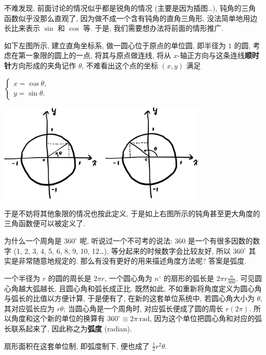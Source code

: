 \begin{tcolorbox}[size=fbox, breakable, enhanced jigsaw, title={任意角度的三角函数}]

不难发现, 前面讨论的情况似乎都是锐角的情况 (主要是因为插图\ldots),
钝角的三角函数似乎没那么直观了, 因为做不成一个含有钝角的直角三角形,
没法简单地用边长比来表示 $\sin$ 和 $\cos$ 等. 于是,
我们需要想办法将前面的情形推广.

如下左图所示, 建立直角坐标系, 做一圆心位于原点的单位圆, 即半径为 $1$
的圆, 考虑在第一象限的圆上的一点, 将其与原点做连线, 将从
$x$-轴正方向与这条连线\textbf{顺时针}方向形成的夹角记作 $\theta$,
不难看出这个点的坐标 $(x,y)$ 满足

$\begin{cases}x=\cos\theta,\\y=\sin\theta.\end{cases}$

\begin{tcolorbox}[size=fbox, breakable, enhanced jigsaw]
\includegraphics[width=0.75\textwidth]{img/image-20230316171124433.png}
\end{tcolorbox}

于是不妨将其他象限的情况也按此定义,
于是如上右图所示的钝角甚至更大角度的三角函数便可以被定义了.

\end{tcolorbox}

\begin{tcolorbox}[size=fbox, breakable, enhanced jigsaw, title={弧度制 (radian)}]

为什么一个周角是 $360^\circ$ 呢, 听说过一个不可考的说法: $360$
是一个有很多因数的数字 (1, 2, 3, 4, 5, 6, 8, 9, 10, 12\ldots),
等分起来的时候数字会比较友好, 所以 $360^\circ$ 其实是非常随意地规定的.
那么有没有更好的用来描述角度方法呢? 答案是弧度.

一个半径为 $r$ 的圆的周长是 $2\pi r$, 一个圆心角为 $n^\circ$
的扇形的弧长是 $2\pi r\frac{n}{360}$. 可见圆心角越大弧越长,
且圆心角和弧长成正比. 既然如此,
不如重新将角度定义为圆心角与弧长的比值以方便计算, 于是便有了,
在新的这套单位系统中, 若圆心角大小为 $\theta$, 其对应弧长应为
$r\theta$; 当圆心角是一个周角时, 对应弧长便成了圆的周长 $r(2\pi)$.
所以角度和这个新的单位的换算有 $360^\circ\equiv 2\pi\ \text{rad}$,
因为这个单位把圆心角和对应的弧长联系起来了, 因此称之为\textbf{弧度}
(radian).

扇形面积在这套单位制, 即弧度制下, 便也成了 $\frac{1}{2}r^2\theta$.

\end{tcolorbox}

